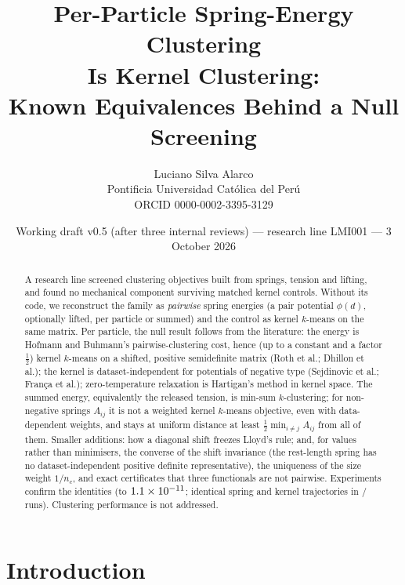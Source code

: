 \documentclass[11pt,a4paper]{article}
\title{\textbf{Per-Particle Spring-Energy Clustering}\\\textbf{Is Kernel Clustering:}\\[2pt]
\large Known Equivalences Behind a Null Screening}
\author{Luciano Silva Alarco\\
\small Pontificia Universidad Cat\'olica del Per\'u\\
\small ORCID 0000-0002-3395-3129}
\date{\small Working draft v0.5 (after three internal reviews) --- research line LMI001 --- 3 October 2026}
\theoremstyle{plain}
\theoremstyle{definition}
\theoremstyle{remark}
\begin{document}
\maketitle

\begin{abstract}
\noindent
A research line screened clustering objectives built from springs, tension and lifting, and found no mechanical component surviving matched kernel controls. Without its code, we reconstruct the family as \emph{pairwise} spring energies (a pair potential $\phi(d)$, optionally lifted, per particle or summed) and the control as kernel $k$-means on the same matrix. Per particle, the null result follows from the literature: the energy is Hofmann and Buhmann's pairwise-clustering cost, hence (up to a constant and a factor $\tfrac12$) kernel $k$-means on a shifted, positive semidefinite matrix (Roth et al.; Dhillon et al.); the kernel is dataset-independent for potentials of negative type (Sejdinovic et al.; Fran\c{c}a et al.); zero-temperature relaxation is Hartigan's method in kernel space. The summed energy, equivalently the released tension, is min-sum $k$-clustering; for non-negative springs $A_{ij}$ it is not a weighted kernel $k$-means objective, even with data-dependent weights, and stays at uniform distance at least $\tfrac12\min_{i\ne j}A_{ij}$ from all of them. Smaller additions: how a diagonal shift freezes Lloyd's rule; and, for values rather than minimisers, the converse of the shift invariance (the rest-length spring has no dataset-independent positive definite representative), the uniqueness of the size weight $1/n_c$, and exact certificates that three functionals are not pairwise. Experiments confirm the identities (to $1.1\times 10^{-11}$; identical spring and kernel trajectories in \EtwoIdentical/\EtwoRuns{} runs). Clustering performance is not addressed.
\end{abstract}

\section{Introduction}\label{sec:intro}
\end{document}

